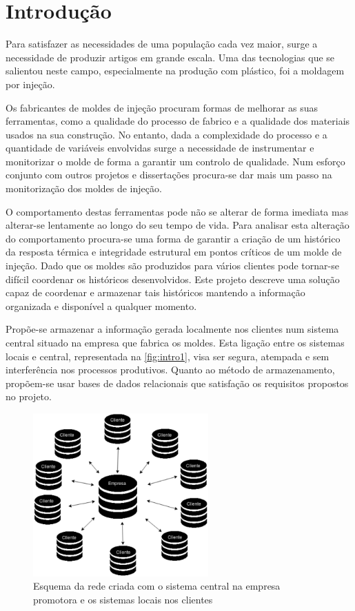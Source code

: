 \documentclass[11pt,twoside,a4paper]{report}
\begin{document}
\chapter{Introdução}
\label{chap:intro}
Para satisfazer as necessidades de uma população cada vez maior, surge a necessidade de produzir artigos em grande escala. Uma das tecnologias que se salientou neste campo, especialmente na produção com plástico, foi a moldagem por injeção.\par
Os fabricantes de moldes de injeção procuram formas de melhorar as suas ferramentas, como a qualidade do processo de fabrico e a qualidade dos materiais usados na sua construção. No entanto, dada a complexidade do processo e a quantidade de variáveis envolvidas surge a necessidade de instrumentar e monitorizar o molde de forma a garantir um controlo de qualidade. Num esforço conjunto com outros projetos e dissertações
procura-se dar mais um passo na monitorização dos moldes de injeção.\par
O comportamento destas ferramentas pode não se alterar de forma imediata mas alterar-se lentamente ao longo do seu tempo de vida. Para analisar esta alteração do comportamento procura-se uma forma de garantir a criação de um histórico da resposta térmica e integridade estrutural em pontos críticos de um molde de injeção. Dado que os moldes são produzidos para vários clientes pode tornar-se difícil coordenar os históricos desenvolvidos. Este projeto descreve uma solução capaz de coordenar e armazenar tais históricos mantendo a informação organizada e disponível a qualquer momento.\par 
Propõe-se armazenar a informação gerada localmente nos clientes num sistema central situado na empresa que fabrica os moldes. Esta ligação entre os sistemas locais e central, representada na \autoref{fig:intro1}, visa ser segura, atempada e sem interferência nos processos produtivos. Quanto ao método de armazenamento, propõem-se usar bases de dados relacionais que satisfação os requisitos propostos no projeto.
\begin{figure}
	\begin{center}
		\includegraphics[width=0.6\textwidth]{Esquema_Rede} %
		\caption[Esquema de rede]{Esquema da rede criada com o sistema central na empresa promotora e os sistemas locais nos clientes}
		\label{fig:intro1}
	\end{center}
\end{figure}
\end{document}
